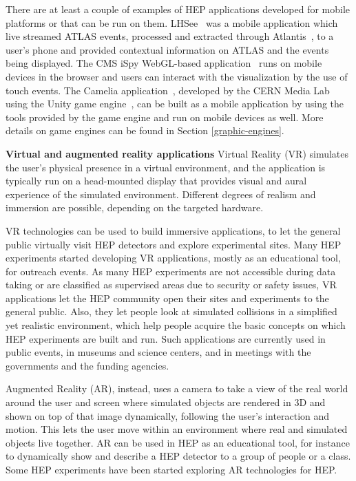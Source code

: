 \documentclass[12pt,a4paper]{article}
\begin{document}
There are at least a couple of examples of HEP applications developed for mobile platforms or that can be run on them. LHSee~\cite{LHSee}
was a mobile application which live streamed ATLAS events, processed and extracted through Atlantis~\cite{ATLASAtlantis}, to a user’s phone and provided contextual information on ATLAS and the
events being displayed. The CMS iSpy WebGL-based application~\cite{CMSISpyWebGL} runs on mobile devices in the browser and users can interact
with the visualization by the use of touch events. The Camelia application~\cite{CERNCamelia}, %
developed by the
CERN Media Lab using the Unity game engine~\cite{Unity3D}, can be built as a mobile application by using the tools provided by the game engine and run on mobile devices as well. More details on game engines can be found in Section \ref{graphic-engines}.

{\bf Virtual and augmented reality applications} Virtual Reality (VR) simulates the user’s physical presence in a virtual environment, and the application is typically run on a head-mounted display that provides visual and aural experience of the simulated environment. Different degrees of realism and immersion are possible, depending on the targeted hardware.

VR technologies can be used to build immersive applications, to let the general public virtually visit HEP detectors and explore experimental sites. Many HEP experiments started developing VR applications, mostly as an educational tool, for outreach events. As many HEP experiments are not accessible during data taking or are classified as supervised areas due to security or safety issues, VR applications let the HEP community open their sites and experiments to the general public. Also, they let people look at simulated  collisions in a simplified yet realistic environment, which help people acquire the basic concepts on which HEP experiments are built and run. Such applications are currently used in public events, in museums and science centers, and in meetings with the governments and the funding agencies.

Augmented Reality (AR), instead, uses a camera to take a view of the real world around the user and screen where simulated objects are rendered in 3D and shown on top of that image dynamically, following the user's interaction and motion. This lets the user move within an environment where real and simulated objects live together. AR can be used in HEP as an educational tool, for instance to dynamically show and describe a HEP detector to a group of people or a class. Some HEP experiments have been started exploring AR  technologies for HEP.
\end{document}
